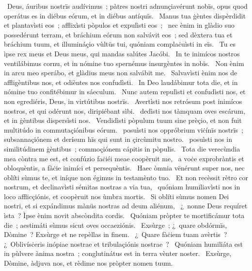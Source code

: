 ~Deus, áuribus nostrïs audívimus~; pàtres nostri adnunçiavérunt nobïs, opus quod operátus es in diébus eórum, et in diébus antíquïs. 
~Manus tua ġèntes dispèrdidit et plantavìsti eos~; afflixìsti pòpulos et expulìsti eos~; 
~nec ènim in glàdio suo possedérunt terram, et bráchium eórum non salvávit eos~; sed dèxtera tua et bráchium tuum, et illumináçio vùltüs tui, quóniam complaċuìsti in eïs. 
~Tu es ìpse rex meus et Deus meus, qui mandas salútes Jacóbi. 
~In te inimícos nostros ventilábimus cornu, et in nómine tuo spernémus insurgèntes in nobïs. 
~Non ènim in arcu meo sperábo, et glàdius meus non salvábit me. 
~Salvavìsti ènim nos de affligèntibus nos, et odièntes nos confudìsti. 
~In Deo laudábimur tota die, et in nómine tuo confitébimur in sáeculum. 
~Nunc autem repulìsti et confudìsti nos, et non egrediéris, Deus, in virtútibus nostrïs. 
~Avertìsti nos retrósum post inimícos nostros, et qui odérunt nos, diripiébant sìbi. 
~dedìsti nos tàmquam oves escárum, et in ġèntibus dispersìsti nos. 
~Vendidìsti pòpulum tuum sine prèçio, et non fuit multitúdo in commutaçiónibus eórum. 
~posuìsti nos oppróbrium viċínïs nostrïs~; subsannaçiónem et derísum hïs qui sunt in çircùmitu nostro. 
~posuìsti nos in similitúdinem ġèntibus~; commoçiónem cápitis in pòpulïs. 
~Tota die verecùndia mea còntra me est, et confúzio faċiéi meae coopèruit me, 
~a voċe exprobràntis et obloquèntis, a fàċie inimíci et persequèntis. 
~Haec òmnia vënérunt super nos, nec oblíti sùmus te, et iníque non égimus in testamènto tuo. 
~Et non recèssit rètro cor nostrum, et declinavìsti sémitas nostras a via tua, 
~quóniam humiliavìsti nos in loco afflicçiónis, et coopèruit nos ùmbra mortis. 
~Si oblíti sùmus nomen Dei nostri, et si expándimus mànüs nostras ad deum aliénum, 
~¿~nonne Deus requíret ìsta~? Ìpse ènim novit abscòndita cordis. 
~Quóniam pròpter te mortificámur tota die~; aestimáti sùmus sicut oves occaeziónis. 
~Exsùrge~; ¿~quare obdórmïs, Dòmine~? Exsùrge et ne repèllas in finem. 
~¿~Quare fàċiem tuam avèrtis~? ¿~Oblivísċeris inópiae nostrae et tribulaçiónis nostrae~? 
~Quóniam humiliáta est in pùlvere ànima nostra~; conglutinátus est in terra vènter noster. 
~Exsùrge, Dòmine, àdjuva nos, et rèdime nos pròpter nomen tuum. 
